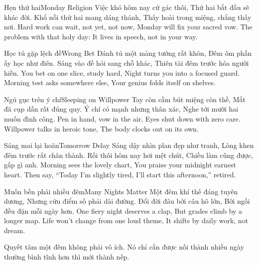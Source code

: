 \begin{tutuyetbox}{Hẹn thứ hai}{Monday Religion}
Việc khó hôm nay cứ gác thôi,
Thứ hai bắt đầu sẽ khác đời.
Khổ nỗi thứ hai mang dáng thánh,
Thấy hoài trong miệng, chẳng thấy nơi.
\tcblower
Hard work can wait, not yet, not now,
Monday will fix your sacred vow.
The problem with that holy day:
It lives in speech, not in your way.
\end{tutuyetbox}

\begin{tutuyetbox}{Học tủ gặp lệch đề}{Wrong Bet}
Đánh tủ một mảng tưởng rất khôn,
Đêm ôm phần ấy học như điên.
Sáng vào đề hỏi sang chỗ khác,
Thiên tài đêm trước hóa người hiền.
\tcblower
You bet on one slice, study hard,
Night turns you into a focused guard.
Morning test asks somewhere else,
Your genius folds itself on shelves.
\end{tutuyetbox}

\begin{tutuyetbox}{Ngủ gục trên ý chí}{Sleeping on Willpower}
Tay còn cầm bút miệng còn thề,
Mắt đã cụp dần rất đúng quy.
Ý chí có mạnh nhưng thân xác,
Nghe tới mười hai muốn đình công.
\tcblower
Pen in hand, vow in the air,
Eyes shut down with zero care.
Willpower talks in heroic tone,
The body clocks out on its own.
\end{tutuyetbox}

\begin{tutuyetbox}{Sáng mai lại hoãn}{Tomorrow Delay}
Sáng dậy nhìn plan đẹp như tranh,
Lòng khen đêm trước rất chân thành.
Rồi thôi hôm nay hơi mệt chút,
Chiều làm cũng được, gấp gì anh.
\tcblower
Morning sees the lovely chart,
You praise your midnight earnest heart.
Then say, “Today I'm slightly tired,
I'll start this afternoon,” retired.
\end{tutuyetbox}

\begin{tutuyetbox}{Muốn bền phải nhiều đêm}{Many Nights Matter}
Một đêm khí thế đáng tuyên dương,
Nhưng cứu điểm số phải dài đường.
Đổi đời đâu bởi câu hô lớn,
Bởi ngồi đều đặn mỗi ngày hơn.
\tcblower
One fiery night deserves a clap,
But grades climb by a longer map.
Life won't change from one loud theme,
It shifts by daily work, not dream.
\end{tutuyetbox}
\begin{ghichu}
Quyết tâm một đêm không phải vô ích. Nó chỉ cần được nối thành nhiều ngày thường bình tĩnh hơn thì mới thành nếp.
\end{ghichu}